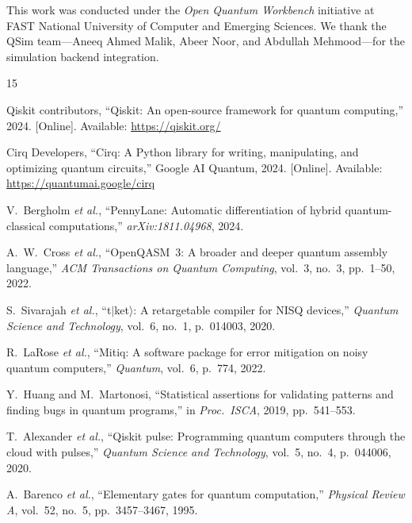 \documentclass[conference]{IEEEtran}
\begin{document}
This work was conducted under the \emph{Open Quantum Workbench} initiative at FAST National University of Computer and Emerging Sciences. We thank the QSim team---Aneeq Ahmed Malik, Abeer Noor, and Abdullah Mehmood---for the simulation backend integration.



\begin{thebibliography}{15}

Qiskit contributors, ``Qiskit: An open-source framework for quantum computing,'' 2024. [Online]. Available: \url{https://qiskit.org/}

Cirq Developers, ``Cirq: A Python library for writing, manipulating, and optimizing quantum circuits,'' Google AI Quantum, 2024. [Online]. Available: \url{https://quantumai.google/cirq}

V.~Bergholm \emph{et al.}, ``PennyLane: Automatic differentiation of hybrid quantum-classical computations,'' \emph{arXiv:1811.04968}, 2024.

A.~W.~Cross \emph{et al.}, ``OpenQASM~3: A broader and deeper quantum assembly language,'' \emph{ACM Transactions on Quantum Computing}, vol.~3, no.~3, pp.~1--50, 2022.

S.~Sivarajah \emph{et al.}, ``t$|$ket$\rangle$: A retargetable compiler for NISQ devices,'' \emph{Quantum Science and Technology}, vol.~6, no.~1, p.~014003, 2020.

R.~LaRose \emph{et al.}, ``Mitiq: A software package for error mitigation on noisy quantum computers,'' \emph{Quantum}, vol.~6, p.~774, 2022.

Y.~Huang and M.~Martonosi, ``Statistical assertions for validating patterns and finding bugs in quantum programs,'' in \emph{Proc.\ ISCA}, 2019, pp.~541--553.

T.~Alexander \emph{et al.}, ``Qiskit pulse: Programming quantum computers through the cloud with pulses,'' \emph{Quantum Science and Technology}, vol.~5, no.~4, p.~044006, 2020.

A.~Barenco \emph{et al.}, ``Elementary gates for quantum computation,'' \emph{Physical Review A}, vol.~52, no.~5, pp.~3457--3467, 1995.


\end{thebibliography}
\end{document}
